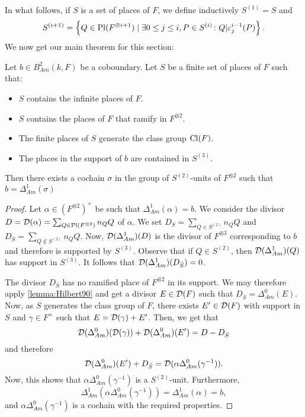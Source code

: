 In what follows, if \(S\) is a set of places of \(F\), we define inductively \(S^{(1)} = S\) and
\[S^{(i+1)} = \left\{Q \in \operatorname{Pl}(F^{\otimes i+1}) \mid \exists 0 \leq j \leq i, P \in S^{(i)} \colon Q|\varepsilon_j^{i-1}(P)\right\}.\]
We now get our main theorem for this section:
\begin{theorem}\label{thm:SUnitTriv}
    Let \(b \in B_{Am}^2(k,F)\) be a coboundary. Let \(S\) be a finite set of places of \(F\) such that:
    \begin{itemize}
        \item \(S\) contains the infinite places of \(F\).
        \item \(S\) contains the places of \(F\) that ramify in \(F^{\otimes 2}\).
        \item The finite places of \(S\) generate the class group \(\operatorname{Cl}(F)\).
        \item The places in the support of \(b\) are contained in \(S^{(3)}\).
    \end{itemize}
    Then there exists a cochain \(\sigma\) in the group of \(S^{(2)}\)-units of \(F^{\otimes 2}\) such that \(b = \Delta_{Am}^1(\sigma)\)
\end{theorem}

\begin{proof}
 Let \(\alpha \in (F^{\otimes 2})^\times\) be such that \(\Delta_{Am}^1(\alpha) = b\). We consider the divisor \(D = \operatorname{\mathcal{D}}(\alpha) = \sum_{Q \in \operatorname{Pl}(F^{\otimes 2})} n_Q Q\) of \(\alpha\). We set \(D_S = \sum_{Q \in S^{(2)}} n_Q Q\) and \(D_{\bar{S}} = \sum_{Q \notin S^{(2)}} n_Q Q\). Now, \(\operatorname{\mathcal{D}}(\Delta_{Am}^1)(D)\) is the divisor of \(F^{\otimes 3}\) corresponding to \(b\) and therefore is supported by \(S^{(3)}\). Observe that if \(Q \in S^{(2)}\), then \(\operatorname{\mathcal{D}}(\Delta_{Am}^1)(Q)\) has support in \(S^{(3)}\). It follows that \(\operatorname{\mathcal{D}}(\Delta_{Am}^1)(D_{\bar{S}}) = 0\).

 The divisor \(D_{\bar{S}}\) has no ramified place of \(F^{\otimes 2}\) in its support. We may therefore apply \cref{lemma:Hilbert90} and get a divisor \(E \in \operatorname{\mathcal{D}}(F)\) such that \(D_{\bar{S}} = \Delta_{Am}^0(E)\). Now, as \(S\) generates the class group of \(F\), there exists \(E' \in \operatorname{\mathcal{D}}(F)\) with support in \(S\) and \(\gamma \in F^\times\) such that \(E = \operatorname{\mathcal{D}}(\gamma) + E'\). Then, we get that
 \[\operatorname{\mathcal{D}}(\Delta_{Am}^0)(\operatorname{\mathcal{D}}(\gamma)) + \operatorname{\mathcal{D}}(\Delta_{Am}^0)(E') = D - D_{\bar{S}}\]
 and therefore
 \[\operatorname{\mathcal{D}}(\Delta_{Am}^0)(E') + D_{\bar{S}} = \operatorname{\mathcal{D}}(\alpha \Delta_{Am}^0(\gamma^{-1})).\]
 Now, this shows that \(\alpha \Delta_{Am}^0(\gamma^{-1})\) is a \(S^{(2)}\)-unit. Furthermore, \[\Delta_{Am}^1(\alpha\Delta_{Am}^0(\gamma^{-1})) = \Delta_{Am}^1(\alpha) = b,\]
 and \(\alpha \Delta_{Am}^0(\gamma^{-1})\) is a cochain with the required properties.
\end{proof}

